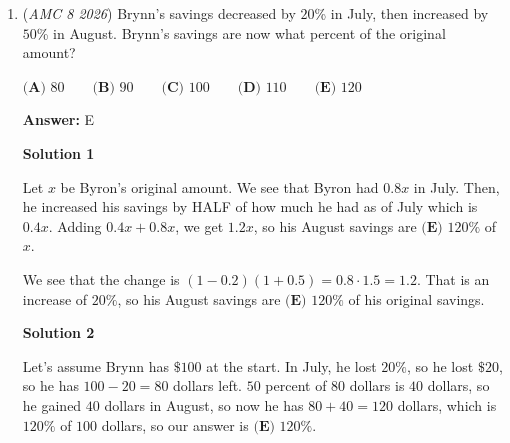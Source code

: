 \begin{enumerate}
 



\textbf{Solution 2 (Easy and simple, no need to know the sides of the triangle!)}

First, consider the regular hexagon. A regular hexagon with side length $5$ cm has perimeter$6\cdot 5 = 30$ cm, which exceeds the available $24$ cm of wire. Therefore, the hexagon cannot be formed, eliminating answer choices $\textbf{(B)}$, $\textbf{(C)}$, and $\textbf{(E)}$.

 Next, consider the square. A square with area $36\text{ cm}^2$ has side length $\sqrt{36}=6$ cm, so its perimeter is$4\cdot 6 = 24$ cm. Thus, the square can be formed.

 At this point, the only remaining answer choices are $\textbf{(A)}$ and $\textbf{(D)}$. But since $\textbf{(A) Triangle only}$ does not include the square and $\textbf{(D)}$ does, the correct answer must be $\textbf{(D)}$.

 Therefore, the shapes Haruki can make are the square and the triangle, and the answer is $\boxed{\textbf{(D) Square and triangle only}}$. Conveniently, the triangle is listed last, so the shapes can be evaluated in the given order.

 


	\item (\textit{AMC 8 2026}) Brynn's savings decreased by $20$\% in July, then increased by $50$\% in August. Brynn's savings are
now what percent of the original amount?


 $\textbf{(A) }80 \qquad \textbf{(B) }90 \qquad \textbf{(C) }100 \qquad \textbf{(D) }110 \qquad \textbf{(E) }120$

 \textbf{Answer: }E



\textbf{Solution 1}

Let $x$ be Byron's original amount. We see that Byron had $0.8x$ in July. Then, he increased his savings by HALF of how much he had as of July which is $0.4x$. Adding $0.4x + 0.8x$, we get $1.2x$, so his August savings are $\boxed{ \textbf{(E) } 120 }\%$ of $x$. 

 We see that the change is $(1-0.2)(1+0.5) = 0.8 \cdot 1.5 = 1.2$. That is an increase of $20\%$, so his August savings are $\boxed{ \textbf{(E) } 120 }\%$ of his original savings.

 



\textbf{Solution 2}

Let's assume Brynn has $\$100$ at the start. In July, he lost $20\%$, so he lost $\$20$, so he has $100-20=80$ dollars left. $50$ percent of $80$ dollars is $40$ dollars, so he gained $40$ dollars in August, so now he has $80+40=120$ dollars, which is $120\%$ of $100$ dollars, so our answer is $\boxed{ \textbf{(E) } 120 }\%$.


\end{enumerate}
